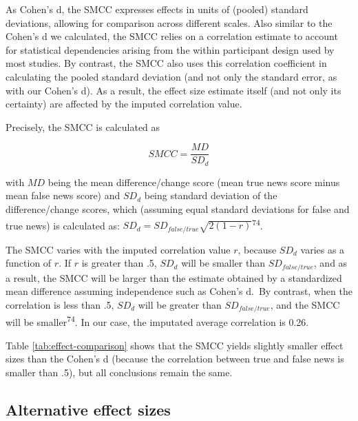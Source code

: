 \documentclass[
  man]{apa6}
\begin{document}
As Cohen's d, the SMCC expresses effects in units of (pooled) standard deviations, allowing for comparison across different scales. Also similar to the Cohen's d we calculated, the SMCC relies on a correlation estimate to account for statistical dependencies arising from the within participant design used by most studies. By contrast, the SMCC also uses this correlation coefficient in calculating the pooled standard deviation (and not only the standard error, as with our Cohen's d). As a result, the effect size estimate itself (and not only its certainty) are affected by the imputed correlation value.

Precisely, the SMCC is calculated as

\[
SMCC = \frac{MD}{SD_d}
\]

with \(MD\) being the mean difference/change score (mean true news score minus mean false news score) and \(SD_d\) being standard deviation of the difference/change scores, which (assuming equal standard deviations for false and true news) is calculated as: \(SD_d = SD_{false/true}\sqrt{2(1-r)}\)\textsuperscript{74}.

The SMCC varies with the imputed correlation value \(r\), because \(SD_d\) varies as a function of \(r\). If \(r\) is greater than .5, \(SD_d\) will be smaller than \(SD_{false/true}\), and as a result, the SMCC will be larger than the estimate obtained by a standardized mean difference assuming independence such as Cohen's d.~By contrast, when the correlation is less than .5, \(SD_d\) will be greater than \(SD_{false/true}\), and the SMCC will be smaller\textsuperscript{74}. In our case, the imputated average correlation is 0.26.

Table \ref{tab:effect-comparison} shows that the SMCC yields slightly smaller effect sizes than the Cohen's d (because the correlation between true and false news is smaller than .5), but all conclusions remain the same.

\subsection{Alternative effect sizes}\label{alternative-effect-sizes}
\end{document}
